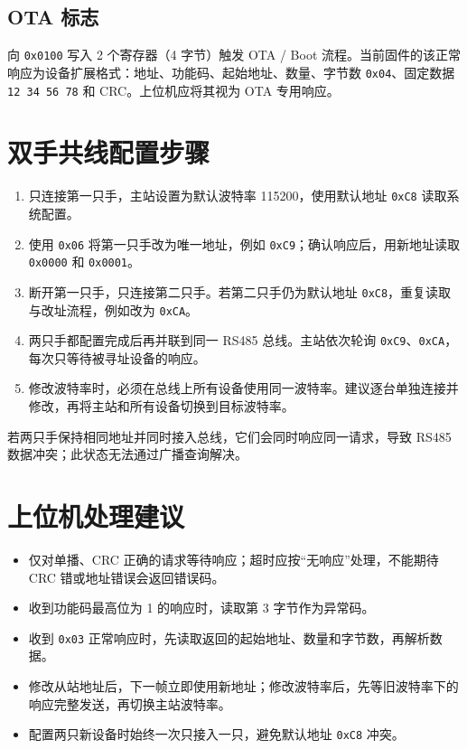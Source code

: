 \documentclass[
  chinese,
]{ctexart}
\providecommand{\tightlist}{%
  \setlength{\itemsep}{0pt}\setlength{\parskip}{0pt}}
\begin{document}
\subsection{OTA 标志}\label{ota-ux6807ux5fd7}

向 \texttt{0x0100} 写入 2 个寄存器（4 字节）触发 OTA / Boot
流程。当前固件的该正常响应为设备扩展格式：地址、功能码、起始地址、数量、字节数
\texttt{0x04}、固定数据 \texttt{12\ 34\ 56\ 78} 和 CRC。上位机应将其视为
OTA 专用响应。

\section{双手共线配置步骤}\label{ux53ccux624bux5171ux7ebfux914dux7f6eux6b65ux9aa4}

\begin{enumerate}
\def\labelenumi{\arabic{enumi}.}
\tightlist
\item
  只连接第一只手，主站设置为默认波特率 115200，使用默认地址
  \texttt{0xC8} 读取系统配置。
\item
  使用 \texttt{0x06} 将第一只手改为唯一地址，例如
  \texttt{0xC9}；确认响应后，用新地址读取 \texttt{0x0000} 和
  \texttt{0x0001}。
\item
  断开第一只手，只连接第二只手。若第二只手仍为默认地址
  \texttt{0xC8}，重复读取与改址流程，例如改为 \texttt{0xCA}。
\item
  两只手都配置完成后再并联到同一 RS485 总线。主站依次轮询
  \texttt{0xC9}、\texttt{0xCA}，每次只等待被寻址设备的响应。
\item
  修改波特率时，必须在总线上所有设备使用同一波特率。建议逐台单独连接并修改，再将主站和所有设备切换到目标波特率。
\end{enumerate}

若两只手保持相同地址并同时接入总线，它们会同时响应同一请求，导致 RS485
数据冲突；此状态无法通过广播查询解决。

\section{上位机处理建议}\label{ux4e0aux4f4dux673aux5904ux7406ux5efaux8bae}

\begin{itemize}
\tightlist
\item
  仅对单播、CRC 正确的请求等待响应；超时应按``无响应''处理，不能期待 CRC
  错或地址错误会返回错误码。
\item
  收到功能码最高位为 1 的响应时，读取第 3 字节作为异常码。
\item
  收到 \texttt{0x03}
  正常响应时，先读取返回的起始地址、数量和字节数，再解析数据。
\item
  修改从站地址后，下一帧立即使用新地址；修改波特率后，先等旧波特率下的响应完整发送，再切换主站波特率。
\item
  配置两只新设备时始终一次只接入一只，避免默认地址 \texttt{0xC8} 冲突。
\end{itemize}
\end{document}
